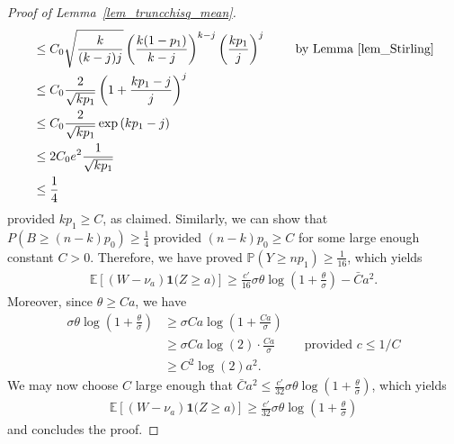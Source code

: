 \documentclass{article}
\newcommand{\one}{\mathbf{1}}
\begin{document}
\begin{proof}[Proof of Lemma~\ref{lem_truncchisq_mean}]
\begin{align*}
        & \leq C_0 \sqrt{\frac{k}{(k-j)j}} \left(\frac{k(1-p_1)}{k-j}\right)^{k-j} \left(\frac{kp_1}{j}\right)^j \qquad \text{ by Lemma~\ref{lem_Stirling}}\\
        &\leq C_0 \frac{2}{\sqrt{kp_1}}\left(1+\frac{kp_1-j}{j}\right)^j \\
        & \leq C_0 \frac{2}{\sqrt{kp_1}}\exp\left(kp_1-j\right)\\
        & \leq 2C_0 e^2 \frac{1}{\sqrt{kp_1}}\\
        & \leq \frac{1}{4}
    \end{align*}
    provided $kp_1 \geq C$, as claimed. 
    Similarly, we can show that $P\left(B \geq (n-k)p_0\right) \geq \frac{1}{4}$ provided $(n-k)p_0 \geq C$ for some large enough constant $C>0$.  
    Therefore, we have proved $\mathbb P(Y \geq np_1) \geq \frac{1}{16}$, which yields
    \begin{align*}
        \mathbb E \left[(W- \nu_a) \one{\big(Z \geq a\big)}\right] \geq \frac{c'}{16}\sigma \theta \log\left(1+ \frac{\theta}{\sigma}\right) - \bar C a^2.
    \end{align*}
    Moreover, since $\theta \geq Ca$, we have
    \begin{align*}
        \sigma \theta \log\left(1+ \frac{\theta}{\sigma}\right)&\geq\sigma Ca \log\left(1+ \frac{Ca}{\sigma}\right) \\
        & \geq \sigma Ca \log(2) \cdot \frac{Ca}{\sigma} \qquad \text{ provided $c \leq 1/C$}\\
        & \geq C^2 \log(2) a^2.
    \end{align*}
    We may now choose $C$ large enough that $\bar C a^2 \leq \frac{c'}{32}\sigma \theta \log\left(1+ \frac{\theta}{\sigma}\right)$,
    which yields
    \begin{align*}
        \mathbb E \left[(W- \nu_a) \one{\big(Z \geq a\big)}\right] \geq \frac{c'}{32}\sigma \theta \log\left(1+ \frac{\theta}{\sigma}\right) 
    \end{align*}
    and concludes the proof.

\end{proof}
\end{document}
